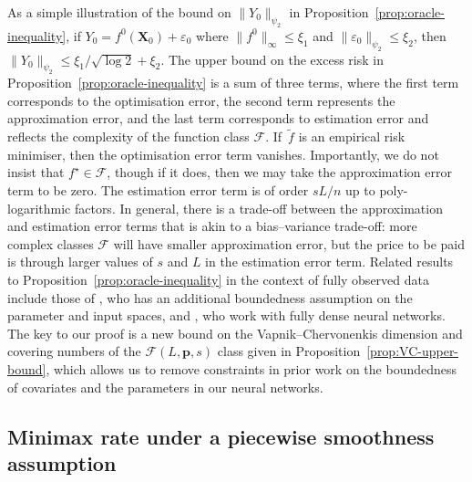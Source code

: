 \documentclass[12pt]{article}
\newcommand{\red}[1]{\textcolor{red}{#1}}
\def\tilde{\widetilde}
\begin{document}
As a simple illustration of the bound on $\|Y_0\|_{\psi_2}$ in Proposition~\ref{prop:oracle-inequality}, if $Y_0 = f^0(\bm X_0) + \varepsilon_0$ where $\|f^0\|_{\infty} \leq \xi_1$ and $\|\varepsilon_0\|_{\psi_2} \leq \xi_2$, then $\|Y_0\|_{\psi_2} \leq \xi_1/\sqrt{\log 2} + \xi_2$. The upper bound on the excess risk in Proposition~\ref{prop:oracle-inequality} is a sum of three terms, where the first term corresponds to the optimisation error, the second term represents the approximation error, and the last term corresponds to estimation error and reflects the complexity of the function class $\mathcal{F}$.  If~$\tilde{f}$ is an empirical risk minimiser, then the optimisation error term vanishes.  Importantly, we do not insist that $f^\star \in \mathcal{F}$, though if it does, then we may take the approximation error term to be zero.  The estimation error term is of order $sL/n$ up to poly-logarithmic factors.  In general, there is a trade-off between the approximation and estimation error terms that is akin to a bias--variance trade-off: more complex classes $\mathcal{F}$ will have smaller approximation error, but the price to be paid is through larger values of $s$ and $L$ in the estimation error term.  Related results to Proposition~\ref{prop:oracle-inequality} in the context of fully observed data include those of \citet{schmidt-hieber2020nonparametric}, who has an additional boundedness assumption on the parameter and input spaces, and \citet{kohler2021rate}, who work with fully dense neural networks.  The key to our proof is a new bound on the Vapnik--Chervonenkis dimension and covering numbers of the $\mathcal{F}(L,\bm p,s)$ class given in Proposition~\ref{prop:VC-upper-bound}, which allows us to remove constraints in prior work on the boundedness of covariates and the parameters in our neural networks.


\subsection{Minimax rate under a piecewise smoothness assumption} \label{sec:minimax-rate}

\end{document}
